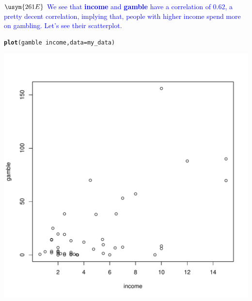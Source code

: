 \documentclass[11pt, a4paper]{article}\usepackage[]{graphicx}\usepackage[]{xcolor}
\makeatletter
\def\maxwidth{ %
  \ifdim\Gin@nat@width>\linewidth
    \linewidth
  \else
    \Gin@nat@width
  \fi
}
\newcommand{\hlopt}[1]{\textcolor[rgb]{0,0,0}{#1}}%
\newcommand{\hlstd}[1]{\textcolor[rgb]{0.345,0.345,0.345}{#1}}%
\newcommand{\hlkwc}[1]{\textcolor[rgb]{0.333,0.667,0.333}{#1}}%
\newcommand{\hlkwd}[1]{\textcolor[rgb]{0.737,0.353,0.396}{\textbf{#1}}}%
\newenvironment{kframe}{%
 \def\at@end@of@kframe{}%
 \ifinner\ifhmode%
  \def\at@end@of@kframe{\end{minipage}}%
  \begin{minipage}{\columnwidth}%
 \fi\fi%
 \def\FrameCommand##1{\hskip\@totalleftmargin \hskip-\fboxsep
 \colorbox{shadecolor}{##1}\hskip-\fboxsep
     \hskip-\linewidth \hskip-\@totalleftmargin \hskip\columnwidth}%
 \MakeFramed {\advance\hsize-\width
   \@totalleftmargin\z@ \linewidth\hsize
   \@setminipage}}%
 {\par\unskip\endMakeFramed%
 \at@end@of@kframe}
\newenvironment{knitrout}{}{} %
\makeatother
\begin{document}
$\usym{261E}$ \textcolor{blue}{We see that \textbf{income} and \textbf{gamble} have a correlation of $0.62$, a pretty decent correlation, implying that, people with higher income spend more on gambling. Let's see their scatterplot.}
\begin{knitrout}
\color{fgcolor}\begin{kframe}
\begin{alltt}
\hlkwd{plot}\hlstd{(gamble} \hlopt{~} \hlstd{income,} \hlkwc{data} \hlstd{= my_data)}
\end{alltt}
\end{kframe}
\includegraphics[width=\maxwidth]{figure/unnamed-chunk-16-1} 
\end{knitrout}

\newpage
\end{document}
